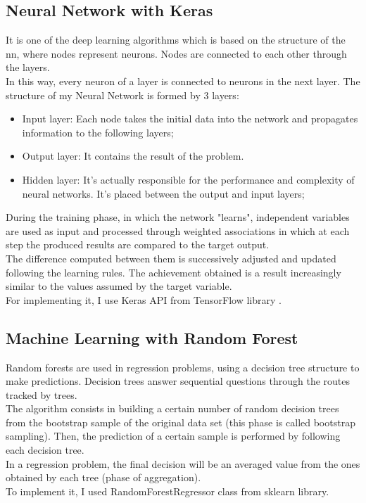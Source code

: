 \subsection{Neural Network with Keras}
It is one of the deep learning algorithms which is based on the structure of the \gls{nn}, where nodes represent neurons.
Nodes are connected to each other through the layers. \\
In this way, every neuron of a layer is connected to neurons in the next layer.
The structure of my Neural Network is formed by 3 layers:
\begin{itemize}
    \item Input layer: Each node takes the initial data into the network and propagates information to the following layers;
    \item Output layer: It contains the result of the problem. 
    \item Hidden layer: It's actually responsible for the performance and complexity of neural networks. It's placed between the output and input layers;
\end{itemize}
During the training phase, in which the network "learns", independent variables are used as input and processed through weighted associations in which at each step the produced results are compared to the target output.\\ The difference computed between them is successively adjusted and updated following the learning rules. The achievement obtained is a result increasingly similar to the values assumed by the target variable.\\ 
For implementing it, I use Keras API from TensorFlow library \cite{tensorflow}.


\subsection{Machine Learning with Random Forest}
Random forests are used in regression problems, using a decision tree structure to make predictions. Decision trees answer sequential questions through the routes tracked by trees.\\
The algorithm consists in building a certain number of random decision trees from the bootstrap sample of the original data set (this phase is called bootstrap sampling). Then, the prediction of a certain sample is performed by following each decision tree. \\In a regression problem, the final decision will be an averaged value from the ones obtained by each tree (phase of aggregation).\\
To implement it, I used RandomForestRegressor class from sklearn library. 


